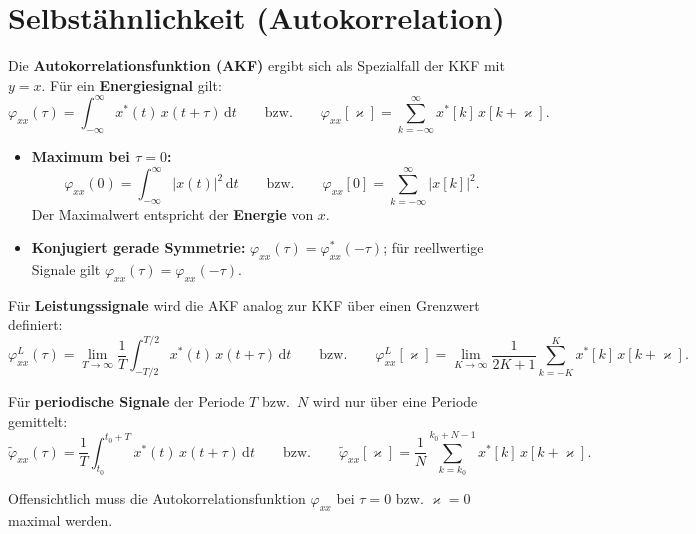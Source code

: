 \newpage
\section{Selbstähnlichkeit (Autokorrelation)}
\label{sec:autokorrelation}

\begin{definition}
Die \textbf{Autokorrelationsfunktion (AKF)} ergibt sich als Spezialfall der KKF
mit $y = x$. Für ein \textbf{Energiesignal} gilt:
$$
\varphi_{xx}(\tau) = \int_{-\infty}^{\infty} x^*(t)\,x(t+\tau)\,\mathrm{d}t
\qquad \text{bzw.} \qquad
\varphi_{xx}[\varkappa] = \sum_{k=-\infty}^{\infty} x^*[k]\,x[k+\varkappa].
$$
\end{definition}

\begin{satz}
\begin{itemize}
  \item \textbf{Maximum bei $\tau = 0$:}
  $$
    \varphi_{xx}(0) = \int_{-\infty}^{\infty} |x(t)|^2\,\mathrm{d}t
    \qquad \text{bzw.} \qquad
    \varphi_{xx}[0] = \sum_{k=-\infty}^{\infty} |x[k]|^2.
  $$
  Der Maximalwert entspricht der \textbf{Energie} von $x$.
  \item \textbf{Konjugiert gerade Symmetrie:}
  $\varphi_{xx}(\tau) = \varphi_{xx}^*(-\tau)$; für reellwertige Signale gilt
  $\varphi_{xx}(\tau) = \varphi_{xx}(-\tau)$.
\end{itemize}
\end{satz}

\begin{definition}
Für \textbf{Leistungssignale} wird die AKF analog zur KKF über einen Grenzwert definiert:
$$
\varphi_{xx}^{L}(\tau) = \lim_{T \to \infty} \frac{1}{T}
  \int_{-T/2}^{T/2} x^*(t)\,x(t+\tau)\,\mathrm{d}t
\qquad \text{bzw.} \qquad
\varphi_{xx}^{L}[\varkappa] = \lim_{K \to \infty} \frac{1}{2K+1}
  \sum_{k=-K}^{K} x^*[k]\,x[k+\varkappa].
$$

Für \textbf{periodische Signale} der Periode $T$ bzw.\ $N$ wird nur über eine Periode
gemittelt:
$$
\tilde{\varphi}_{xx}(\tau) = \frac{1}{T}\int_{t_0}^{t_0+T} x^*(t)\,x(t+\tau)\,\mathrm{d}t
\qquad \text{bzw.} \qquad
\tilde{\varphi}_{xx}[\varkappa] = \frac{1}{N}\sum_{k=k_0}^{k_0+N-1} x^*[k]\,x[k+\varkappa].
$$
\end{definition}


Offensichtlich muss die Autokorrelationsfunktion $\varphi_{xx}$ bei $\tau = 0$ bzw. $\varkappa = 0$ maximal werden.

